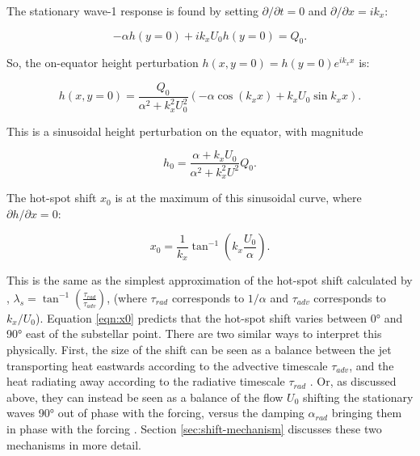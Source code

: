 The stationary wave-1 response is found by setting $\partial/ \partial t = 0 $ and $\partial/ \partial x =i k_{x}$:

\begin{equation}\label{eqn:on-equator-height}
-\alpha h (y=0) + i k_{x} { U }_{0} h (y=0) = Q_{0}.
\end{equation}

So, the on-equator height perturbation $h (x,y=0)=h (y=0)e^{i k_{x}x}$ is:

\begin{equation}\label{eqn:phi-curve}
  h (x,y=0)=\frac{Q_{0}}{\alpha^{2}+k_{x}^{2}U_{0}^{2}}(-\alpha \cos(k_{x}x)+k_{x}U_{0}\sin{k_{x}x}).
\end{equation}

This is a sinusoidal height perturbation on the equator, with magnitude

\begin{equation}\label{eqn:1d-scaling-hss}
  h_{0}=\frac{\alpha+k_{x}U_{0}}{\alpha^{2}+k_{x}^{2}U^{2}}Q_{0}.
\end{equation}

The hot-spot shift $x_{0}$ is at the maximum of this sinusoidal curve, where $\partial h / \partial x = 0$:

\begin{equation}\label{eqn:x0}
  x_{0}=\frac{1}{k_{x}}\tan^{-1}(k_{x}\frac{U_{0}}{\alpha}).
\end{equation}

This is the same as the simplest approximation of the hot-spot shift calculated by \citet{zhang2017dynamics}, $\lambda_{s}=\tan^{-1}(\frac{\tau_{rad}}{\tau_{adv}})$, (where $\tau_{rad}$ corresponds to $1/\alpha$ and $\tau_{adv}$ corresponds to $k_{x}/U_{0}$). Equation \ref{eqn:x0} predicts that the hot-spot shift varies between \ang{0} and \ang{90} east of the substellar point. There are two similar ways to interpret this physically. First, the size of the shift can be seen as a balance between the jet transporting heat eastwards according to the advective timescale $\tau_{adv}$, and the heat radiating away according to the radiative timescale $\tau_{rad}$ \citep{komacek2016daynightI, zhang2017dynamics, hammond2017climate}. Or, as discussed above, they can instead be seen as a balance of the flow $U_{0}$ shifting the stationary waves \ang{90} out of phase with the forcing, versus the damping $\alpha_{rad}$ bringing them in phase with the forcing \citep{tsai2014three, hammond2018wavemean}. Section \ref{sec:shift-mechanism} discusses these two mechanisms in more detail.


